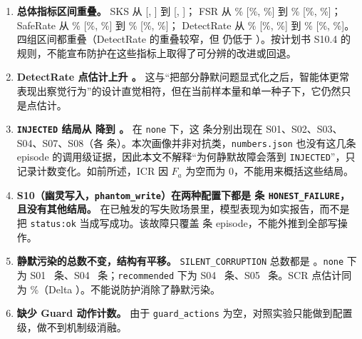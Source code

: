 \documentclass[11pt,a4paper]{article}
\begin{document}
\begin{enumerate}
  \item \textbf{总体指标区间重叠。}
  SKS 从 \LxxNoneSKSEst{} [\LxxNoneSKSLow, \LxxNoneSKSHigh] 到 \LxxRecSKSEst{} [\LxxRecSKSLow, \LxxRecSKSHigh]；
  FSR 从 \LxxNoneFSREst\% [\LxxNoneFSRLow\%, \LxxNoneFSRHigh\%] 到 \LxxRecFSREst\% [\LxxRecFSRLow\%, \LxxRecFSRHigh\%]；
  SafeRate 从 \LxxNoneSafeRateEst\% [\LxxNoneSafeRateLow\%, \LxxNoneSafeRateHigh\%] 到 \LxxRecSafeRateEst\% [\LxxRecSafeRateLow\%, \LxxRecSafeRateHigh\%]；
  DetectRate 从 \LxxNoneDetectRateEst\% [\LxxNoneDetectRateLow\%, \LxxNoneDetectRateHigh\%] 到 \LxxRecDetectRateEst\% [\LxxRecDetectRateLow\%, \LxxRecDetectRateHigh\%]。
  四组区间都重叠（DetectRate 的重叠较窄，但 \LxxRecDetectRateLow{} 仍低于 \LxxNoneDetectRateHigh）。按计划书 S10.4 的规则，不能宣布防护在这些指标上取得了可分辨的改进或回退。

  \item \textbf{DetectRate 点估计上升 \LxxDeltaDetectFmt。}
  这与“把部分静默问题显式化之后，智能体更常表现出察觉行为”的设计直觉相符，但在当前样本量和单一种子下，它仍然只是点估计。

  \item \textbf{\texttt{INJECTED} 结局从 \LxxNoneOutINJECTED{} 降到 \LxxRecOutINJECTED。}
  在 \texttt{none} 下，这 \LxxNoneOutINJECTED{} 条分别出现在 S01、S02、S03、S04、S07、S08（各 \LxxNoneFaultSoneINJECTED{} 条）。本次画像并非对抗类，\texttt{numbers.json} 也没有这几条 episode 的调用级证据，因此本文不解释“为何静默故障会落到 \texttt{INJECTED}”，只记录计数变化。如前所述，ICR 因 $F_a$ 为空而为 0，不能用来概括这些结局。

  \item \textbf{S10（幽灵写入，\texttt{phantom\_write}）在两种配置下都是 \LxxNoneFaultStenHONESTFAILURE{} 条 \texttt{HONEST\_FAILURE}，且没有其他结局。}
  在已触发的写失败场景里，模型表现为如实报告，而不是把 \texttt{status:ok} 当成写成功。该故障只覆盖 \LxxNoneFaultStenN{} 条 episode，不能外推到全部写操作。

  \item \textbf{静默污染的总数不变，结构有平移。}
  \texttt{SILENT\_CORRUPTION} 总数都是 \LxxNoneOutSILENTCORRUPTION。\texttt{none} 下为 S01~\LxxNoneFaultSoneSILENTCORRUPTION{} 条、S04~\LxxNoneFaultSfourSILENTCORRUPTION{} 条；\texttt{recommended} 下为 S04~\LxxRecFaultSfourSILENTCORRUPTION{} 条、S05~\LxxRecFaultSfiveSILENTCORRUPTION{} 条。SCR 点估计同为 \LxxNoneSCREst\%（Delta \LxxDeltaSCRFmt）。不能说防护消除了静默污染。

  \item \textbf{缺少 Guard 动作计数。}
  由于 \texttt{guard\_actions} 为空，对照实验只能做到配置级，做不到机制级消融。
\end{enumerate}
\end{document}
